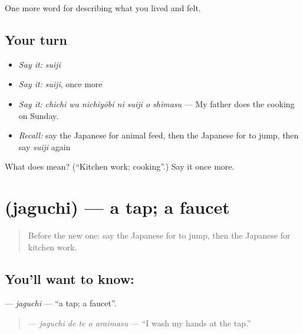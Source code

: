 \begin{grammarlens}[title={What you've built}]
One more word for describing what you lived and felt.
\end{grammarlens}

\subsection*{Your turn}
\begin{itemize}
\raggedright
  \item \emph{Say it:} \emph{suiji}
  \item \emph{Say it:} \emph{suiji}, once more
  \item \emph{Say it:} \emph{chichi wa nichiyōbi ni suiji o shimasu} — My father does the cooking on Sunday.
  \item \emph{Recall:} say the Japanese for animal feed, then the Japanese for to jump, then say \emph{suiji} again
\end{itemize}

\begin{tcolorbox}[breakable,colback=teal!4,colframe=teal!35!black,title={Before you move on}]
What does  mean? (\textquotedblleft{}Kitchen work; cooking\textquotedblright{}.) Say it once more.
\end{tcolorbox}
\section[\texorpdfstring{\ja{じゃぐち} (jaguchi)}{じゃぐち (jaguchi)}]{ (jaguchi) — a tap; a faucet}

\label{lesson:JA-C491-jaguchi}



\begin{quote}
Before the new one: say the Japanese for to jump, then the Japanese for kitchen work.
\end{quote}

\subsection*{You'll want to know: }
\textbf{} — \emph{jaguchi} — \textquotedblleft{}a tap; a faucet\textquotedblright{}.

\begin{quote}
\textbf{  } — \emph{jaguchi de te o araimasu} — \textquotedblleft{}I wash my hands at the tap.\textquotedblright{}
\end{quote}

